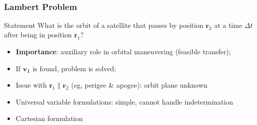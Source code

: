 \documentclass{beamer}
\begin{document}
\begin{frame}
\begin{columns}
\begin{column}{0.5\linewidth}
\begin{figure}[htbp]
                \caption{~\cite{curtis2015orbital}}
            \end{figure}
        \end{column}
    \end{columns}
\end{frame}

\begin{frame}
    \frametitle{Lambert Problem}
    \pause
    \begin{block}{Statement}
        What is the orbit of a satellite that passes by position \(\mathbf{r}_2\) at a time \(\Delta t\) after being in position \(\mathbf{r}_1\)?
    \end{block}
    \begin{itemize}\pause
        \item \textbf{Importance}: auxiliary role in orbital maneuvering (feasible transfer);\pause
        \item If \(\mathbf{v_1}\) is found, problem is solved;\pause
        \item Issue with \(\mathbf{r}_1 \parallel \mathbf{r}_2\) (eg, perigee \& apogee): orbit plane unknown\pause
        \item Universal variable formulations: simple, cannot handle indetermination~\cite{curtis2015orbital}\cite{sukhanov}\pause
        \item Cartesian formulation~\cite{embedded_lambert}\pause
    \end{itemize}
\end{frame}
\end{document}
